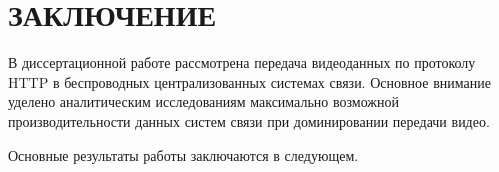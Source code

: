\chapter*{ЗАКЛЮЧЕНИЕ}						%


В диссертационной работе рассмотрена передача видеоданных по протоколу HTTP в беспроводных централизованных системах связи. Основное внимание уделено аналитическим исследованиям максимально возможной производительности данных систем связи при доминировании передачи видео.

Основные результаты работы заключаются в следующем.

